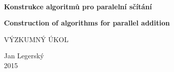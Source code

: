 \documentclass[a4paper, 10pt,oneside]{book}
\newcommand{\nazevcz}{Konstrukce algoritm\r u pro paraleln\'i s\v c\'it\'an\'i}
\newcommand{\nazeven}{Construction of algorithms for parallel addition}
\newcommand{\autor}{Jan Legersk\'y}
\newcommand{\rok}{2015}
\begin{document}

\thispagestyle{empty}

\begin{center}
	~ %
	\vspace{5mm} %

	{\Large \bf \nazevcz }

	\vspace{10mm}%
	
	{\Large \bf \nazeven }

	\vspace{10mm}%

	{\large  VÝZKUMNÝ ÚKOL}

	\vfill %

	{\large 
	\autor\\

	\rok\\
	}

\end{center}
\end{document}
